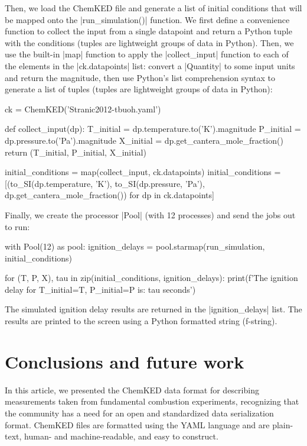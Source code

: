 \documentclass[12pt]{ijck}
\newcommand\ck{ChemKED}
\begin{document}
Then, we load the ChemKED file and generate a list of initial conditions that will be mapped onto
the \pybox|run_simulation()| function. We first define a convenience function to collect the input
from a single datapoint and return a Python tuple with the conditions (tuples are lightweight groups
of data in Python). Then, we use the built-in \pybox|map| function to apply the
\pybox|collect_input| function to each of the elements in the \pybox|ck.datapoints| list: convert a
\pybox|Quantity| to some input units and return the magnitude, then use Python's list comprehension
syntax to generate a list of tuples (tuples are lightweight groups of data in Python):
%
\begin{pythonbox}
ck = ChemKED('Stranic2012-tbuoh.yaml')

def collect_input(dp):
    T_initial = dp.temperature.to('K').magnitude
    P_initial = dp.pressure.to('Pa').magnitude
    X_initial = dp.get_cantera_mole_fraction()
    return (T_initial, P_initial, X_initial)

initial_conditions = map(collect_input, ck.datapoints)
initial_conditions = [(to_SI(dp.temperature, 'K'), to_SI(dp.pressure, 'Pa'), dp.get_cantera_mole_fraction()) for dp in ck.datapoints]
\end{pythonbox}

Finally, we create the processor \pybox|Pool| (with 12 processes) and send the jobs out to run:
%
\begin{pythonbox}
with Pool(12) as pool:
    ignition_delays = pool.starmap(run_simulation, initial_conditions)

for (T, P, X), tau in zip(initial_conditions, ignition_delays):
    print(f'The ignition delay for T_initial={T}, P_initial={P} is: {tau} seconds')
\end{pythonbox}
%
The simulated ignition delay results are returned in the \pybox|ignition_delays| list. The results
are printed to the screen using a Python formatted string (f-string).
\section{Conclusions and future work}

In this article, we presented the \ck{} data format for describing measurements
taken from fundamental combustion experiments, recognizing that the community
has a need for an open and standardized data serialization format. \ck{} files
are formatted using the YAML language and are plain-text, human- and
machine-readable, and easy to construct.
\end{document}
